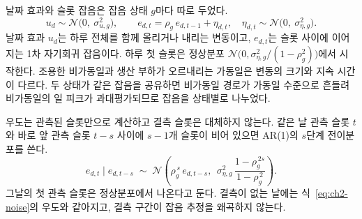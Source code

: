 날짜 효과와 슬롯 잡음은 잡음 상태 $g$마다 따로 두었다.
\begin{equation}
u_d \sim \mathcal N\big(0,\ \sigma^2_{u,g}\big),
\qquad
e_{d,t} = \rho_g\, e_{d,t-1} + \eta_{d,t},\quad \eta_{d,t}\sim \mathcal N\big(0,\ \sigma^2_{\eta,g}\big).
\label{eq:ch2-noise}
\end{equation}
날짜 효과 $u_d$는 하루 전체를 함께 올리거나 내리는 변동이고, $e_{d,t}$는 슬롯 사이에 이어지는 1차 자기회귀 잡음이다. 하루 첫 슬롯은 정상분포 $\mathcal N\big(0,\sigma^2_{\eta,g}/(1-\rho_g^2)\big)$에서 시작한다. 조용한 비가동일과 생산 부하가 오르내리는 가동일은 변동의 크기와 지속 시간이 다르다. 두 상태가 같은 잡음을 공유하면 비가동일 경로가 가동일 수준으로 흔들려 비가동일의 일 피크가 과대평가되므로 잡음을 상태별로 나누었다.

우도는 관측된 슬롯만으로 계산하고 결측 슬롯은 대체하지 않는다. 같은 날 관측 슬롯 $t$와 바로 앞 관측 슬롯 $t-s$ 사이에 $s-1$개 슬롯이 비어 있으면 AR(1)의 $s$단계 전이분포를 쓴다.
\begin{equation}
e_{d,t} \mid e_{d,t-s} \;\sim\; \mathcal N\!\left(\rho_g^{\,s}\, e_{d,t-s},\ \ \sigma^2_{\eta,g}\,\frac{1-\rho_g^{\,2s}}{1-\rho_g^{\,2}}\right).
\label{eq:ch2-gap}
\end{equation}
그날의 첫 관측 슬롯은 정상분포에서 나온다고 둔다. 결측이 없는 날에는 식~\eqref{eq:ch2-noise}의 우도와 같아지고, 결측 구간이 잡음 추정을 왜곡하지 않는다.


